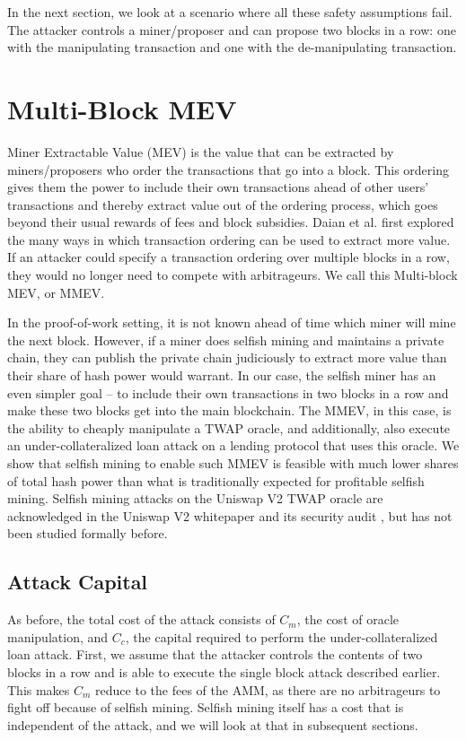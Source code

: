 \documentclass[conference]{IEEEtran}
\begin{document}
In the next section, we look at a scenario where all these safety assumptions fail. The attacker controls a miner/proposer and can propose two blocks in a row: one with the manipulating transaction and one with the de-manipulating transaction. 

\section{Multi-Block MEV}
Miner Extractable Value (MEV) is the value that can be extracted by miners/proposers who order the transactions that go into a block. This ordering gives them the power to include their own transactions ahead of other users' transactions and thereby extract value out of the ordering process, which goes beyond their usual rewards of fees and block subsidies. Daian et al. \cite{daian2019flashboys} first explored the many ways in which transaction ordering can be used to extract more value. If an attacker could specify a transaction ordering over multiple blocks in a row, they would no longer need to compete with arbitrageurs. We call this Multi-block MEV, or MMEV. 

In the proof-of-work setting, it is not known ahead of time which miner will mine the next block. However, if a miner does selfish mining \cite{eyal2014majority,sapirshtein2016optimal,Ritz_2018} and maintains a private chain, they can publish the private chain judiciously to extract more value than their share of hash power would warrant. In our case, the selfish miner has an even simpler goal -- to include their own transactions in two blocks in a row and make these two blocks get into the main blockchain. The MMEV, in this case, is the ability to cheaply manipulate a TWAP oracle, and additionally, also execute an under-collateralized loan attack on a lending protocol that uses this oracle. We show that selfish mining to enable such MMEV is feasible with much lower shares of total hash power than what is traditionally expected for profitable selfish mining. Selfish mining attacks on the Uniswap V2 TWAP oracle are acknowledged in the Uniswap V2 whitepaper \cite{Adams2020UniV2} and its security audit \cite{UniswapAudit}, but has not been studied formally before.

\subsection{Attack Capital}
As before, the total cost of the attack consists of $C_m$, the cost of oracle manipulation, and $C_c$, the capital required to perform the under-collateralized loan attack. First, we assume that the attacker controls the contents of two blocks in a row and is able to execute the single block attack described earlier. This makes $C_m$ reduce to the fees of the AMM, as there are no arbitrageurs to fight off because of selfish mining. Selfish mining itself has a cost that is independent of the attack, and we will look at that in subsequent sections.
\end{document}
